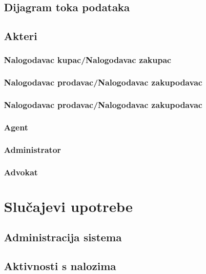 \documentclass{article}
\begin{document}
\newpage
\subsection{\bfseries Dijagram toka podataka}

\newpage
\subsection{\bfseries Akteri}

\newpage
\subsubsection{\bfseries Nalogodavac kupac/Nalogodavac zakupac}

\newpage
\subsubsection{\bfseries Nalogodavac prodavac/Nalogodavac zakupodavac}

\newpage
\subsubsection{\bfseries Nalogodavac prodavac/Nalogodavac zakupodavac}

\newpage
\subsubsection{\bfseries Agent}

\newpage
\subsubsection{\bfseries Administrator}

\newpage
\subsubsection{\bfseries Advokat}

\newpage
\section{\bfseries Slu\v{c}ajevi upotrebe}

\newpage
\subsection{\bfseries Administracija sistema}

\newpage
\subsection{\bfseries Aktivnosti s nalozima}
\end{document}
